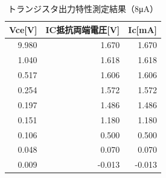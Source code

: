 \documentclass[titlepage]{jarticle}
\begin{document}
\begin{table}[htbp]
    \caption{トランジスタ出力特性測定結果（8μA）}
    \begin{center}
        \begin{tabular}{r|r|r}
            \hline
            \multicolumn{1}{l|}{Vce[V]} & \multicolumn{1}{l|}{IC抵抗両端電圧[V]} & \multicolumn{1}{l}{Ic[mA]} \\ \hline
            9.980                       & 1.670                                  & 1.670                      \\ \hline
            1.040                       & 1.618                                  & 1.618                      \\ \hline
            0.517                       & 1.606                                  & 1.606                      \\ \hline
            0.254                       & 1.572                                  & 1.572                      \\ \hline
            0.197                       & 1.486                                  & 1.486                      \\ \hline
            0.151                       & 1.180                                  & 1.180                      \\ \hline
            0.106                       & 0.500                                  & 0.500                      \\ \hline
            0.048                       & 0.070                                  & 0.070                      \\ \hline
            0.009                       & -0.013                                 & -0.013                     \\ \hline
        \end{tabular}
    \end{center}
    \label{トランジスタ出力特性測定結果（8μA）}
\end{table}
\end{document}
